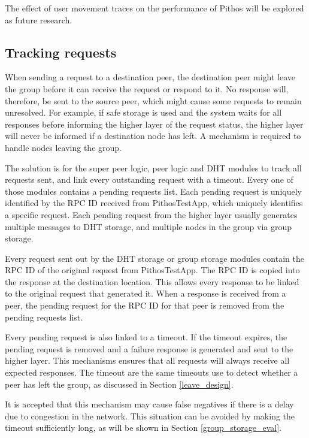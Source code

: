 The effect of user movement traces on the performance of Pithos will be explored as future research.

\subsection{Tracking requests}
\label{pending_rpcs_implementation}

When sending a request to a destination peer, the destination peer might leave the group before it can receive the request or respond to it. No response will, therefore, be sent to the source peer, which might cause some requests to remain unresolved. For example, if safe storage is used and the system waits for all responses before informing the higher layer of the request status, the higher layer will never be informed if a destination node has left. A mechanism is required to handle nodes leaving the group.

The solution is for the super peer logic, peer logic and DHT modules to track all requests sent, and link every outstanding request with a timeout. Every one of those modules contains a pending requests list. Each pending request is uniquely identified by the RPC ID received from PithosTestApp, which uniquely identifies a specific request. Each pending request from the higher layer usually generates multiple messages to DHT storage, and multiple nodes in the group via group storage.

Every request sent out by the DHT storage or group storage modules contain the RPC ID of the original request from PithosTestApp. The RPC ID is copied into the response at the destination location. This allows every response to be linked to the original request that generated it. When a response is received from a peer, the pending request for the RPC ID for that peer is removed from the pending requests list.

Every pending request is also linked to a timeout. If the timeout expires, the pending request is removed and a failure response is generated and sent to the higher layer. This mechanisms ensures that all requests will always receive all expected responses. The timeout are the same timeouts use to detect whether a peer has left the group, as discussed in Section \ref{leave_design}.

It is accepted that this mechanism may cause false negatives if there is a delay due to congestion in the network. This situation can be avoided by making the timeout sufficiently long, as will be shown in Section \ref{group_storage_eval}.

